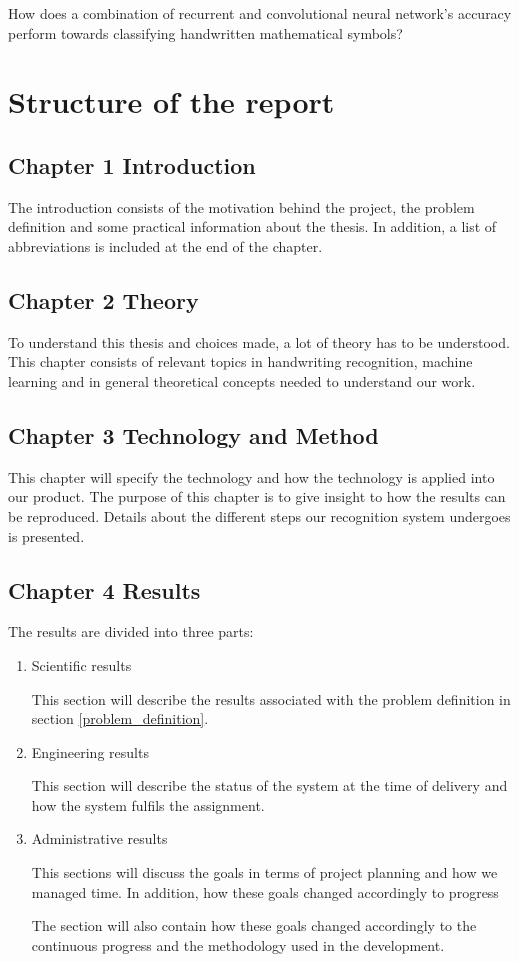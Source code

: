 How does a combination of recurrent and convolutional neural network's accuracy perform towards classifying handwritten mathematical symbols?

\section{Structure of the report}
\subsection{Chapter 1 Introduction}
The introduction consists of the motivation behind the project, the problem definition and some practical information about the thesis. In addition, a list of abbreviations is included at the end of the chapter.

\subsection{Chapter 2 Theory}
To understand this thesis and choices made, a lot of theory has to be understood. This chapter consists of relevant topics in handwriting recognition, machine learning and in general theoretical concepts needed to understand our work.

\subsection{Chapter 3 Technology and Method}
This chapter will specify the technology and how the technology is applied into our product. The purpose of this chapter is to give insight to how the results can be reproduced. Details about the different steps our recognition system undergoes is presented.

\subsection{Chapter 4 Results}
The results are divided into three parts:
\begin{enumerate}
    \item Scientific results
    
    This section will describe the results associated with the problem definition in section \ref{problem_definition}.
    
    \item Engineering results
    
    This section will describe the status of the system at the time of delivery and how the system fulfils the assignment.
    
    \item Administrative results
    
    This sections will discuss the goals in terms of project planning and how we managed time. In addition, how these goals changed accordingly to progress 
    
    The section will also contain how these goals changed accordingly to the continuous progress and the methodology used in the development.
    
\end{enumerate}

